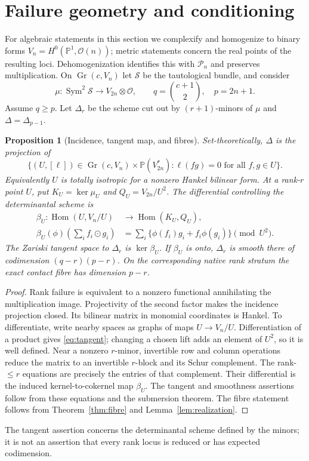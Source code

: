 \documentclass[11pt,reqno]{amsart}
\numberwithin{equation}{section}
\newtheorem{proposition}[theorem]{Proposition}
\theoremstyle{definition}\newtheorem{definition}[theorem]{Definition}
\theoremstyle{remark}\newtheorem{remark}[theorem]{Remark}
\newcommand{\Pj}{\mathbb P}
\newcommand{\PP}{\mathcal P}
\newcommand{\Sym}{\operatorname{Sym}}
\newcommand{\Gr}{\operatorname{Gr}}
\begin{document}
\section{Failure geometry and conditioning}\label{sec:failure}
For algebraic statements in this section we complexify and homogenize to binary forms $V_n=H^0(\Pj^1,\mathcal O(n))$; metric statements concern the real points of the resulting loci. Dehomogenization identifies this with $\PP_n$ and preserves multiplication. On $\Gr(c,V_n)$ let $\mathcal S$ be the tautological bundle, and consider
\[
 \mu:\Sym^2\mathcal S\longrightarrow V_{2n}\otimes\mathcal O,
 \qquad q=\binom{c+1}{2},\quad p=2n+1.
\]
Assume $q\ge p$. Let $\Delta_r$ be the scheme cut out by $(r+1)$-minors of $\mu$ and $\Delta=\Delta_{p-1}$.

\begin{proposition}[Incidence, tangent map, and fibres]\label{prop:failure}
Set-theoretically, $\Delta$ is the projection of
\[
 \{(U,[\ell])\in\Gr(c,V_n)\times\Pj(V_{2n}^*):
                  \ell(fg)=0\text{ for all }f,g\in U\}.
\]
Equivalently $U$ is totally isotropic for a nonzero Hankel bilinear form. At a rank-$r$ point $U$, put $K_U=\ker\mu_U$ and $Q_U=V_{2n}/U^2$. The differential controlling the determinantal scheme is
\begin{equation}\label{eq:tangent}
 \begin{split}
 \beta_U:\operatorname{Hom}(U,V_n/U)&\longrightarrow
                         \operatorname{Hom}(K_U,Q_U),\\
 \beta_U(\phi)\left(\sum_i f_i\odot g_i\right)
       &=\sum_i\{\phi(f_i)g_i+f_i\phi(g_i)\}\pmod{U^2}.
 \end{split}
\end{equation}
The Zariski tangent space to $\Delta_r$ is $\ker\beta_U$. If $\beta_U$ is onto, $\Delta_r$ is smooth there of codimension $(q-r)(p-r)$. On the corresponding native rank stratum the exact contact fibre has dimension $p-r$.
\end{proposition}
\begin{proof}
Rank failure is equivalent to a nonzero functional annihilating the multiplication image. Projectivity of the second factor makes the incidence projection closed. Its bilinear matrix in monomial coordinates is Hankel. To differentiate, write nearby spaces as graphs of maps $U\to V_n/U$. Differentiation of a product gives \eqref{eq:tangent}; changing a chosen lift adds an element of $U^2$, so it is well defined. Near a nonzero $r$-minor, invertible row and column operations reduce the matrix to an invertible $r$-block and its Schur complement. The rank-$\le r$ equations are precisely the entries of that complement. Their differential is the induced kernel-to-cokernel map $\beta_U$. The tangent and smoothness assertions follow from these equations and the submersion theorem. The fibre statement follows from Theorem~\ref{thm:fibre} and Lemma~\ref{lem:realization}.
\end{proof}
The tangent assertion concerns the determinantal scheme defined by the minors; it is not an assertion that every rank locus is reduced or has expected codimension.
\end{document}
